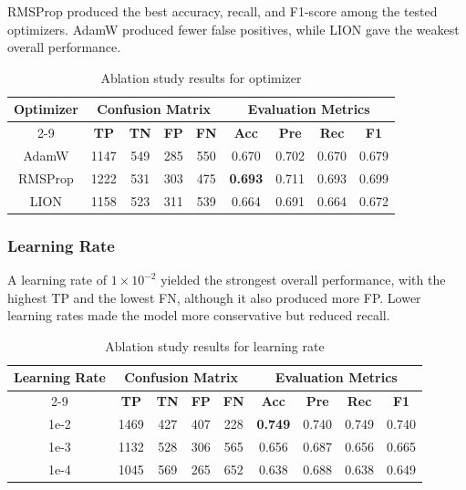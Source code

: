 \documentclass[10pt,TimesNewRoman,a4paper]{matrikenglish}
\begin{document}
RMSProp produced the best accuracy, recall, and F1-score among the tested optimizers. AdamW produced fewer false positives, while LION gave the weakest overall performance.

\begin{table}[H]
    \centering
    \caption{Ablation study results for optimizer}
    \label{tab:ablasi optimizer}
    \begin{tabular}{c c c c c c c c c}
        \hline
        \multirow{2}{*}{\textbf{Optimizer}} & \multicolumn{4}{c}{\textbf{Confusion Matrix}} & \multicolumn{4}{c}{\textbf{Evaluation Metrics}} \\ \cline{2-9}
         & \textbf{TP} & \textbf{TN} & \textbf{FP} & \textbf{FN} & \textbf{Acc} & \textbf{Pre} & \textbf{Rec} & \textbf{F1} \\ \hline
        AdamW & 1147 & 549 & 285 & 550 & 0.670 & 0.702 & 0.670 & 0.679 \\ 
        RMSProp & 1222 & 531 & 303 & 475 & \textbf{0.693} & 0.711 & 0.693 & 0.699 \\ 
        LION & 1158 & 523 & 311 & 539 & 0.664 & 0.691 & 0.664 & 0.672 \\ \hline
    \end{tabular}
\end{table}

\subsubsection{Learning Rate}
\label{IV.lr}

A learning rate of \(1\times10^{-2}\) yielded the strongest overall performance, with the highest TP and the lowest FN, although it also produced more FP. Lower learning rates made the model more conservative but reduced recall.

\begin{table}[H]
    \centering
    \caption{Ablation study results for learning rate}
    \label{tab:ablasi lr}
    \begin{tabular}{c c c c c c c c c}
        \hline
        \multirow{2}{*}{\textbf{Learning Rate}} & \multicolumn{4}{c}{\textbf{Confusion Matrix}} & \multicolumn{4}{c}{\textbf{Evaluation Metrics}} \\ \cline{2-9}
         & \textbf{TP} & \textbf{TN} & \textbf{FP} & \textbf{FN} & \textbf{Acc} & \textbf{Pre} & \textbf{Rec} & \textbf{F1} \\ \hline
        1e-2 & 1469 & 427 & 407 & 228 & \textbf{0.749} & 0.740 & 0.749 & 0.740 \\ 
        1e-3 & 1132 & 528 & 306 & 565 & 0.656 & 0.687 & 0.656 & 0.665 \\ 
        1e-4 & 1045 & 569 & 265 & 652 & 0.638 & 0.688 & 0.638 & 0.649 \\ \hline
    \end{tabular}
\end{table}
\end{document}
